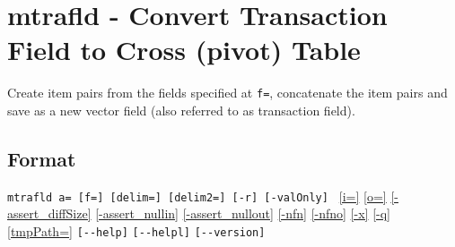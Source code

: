 
%

\section{mtrafld - Convert Transaction Field to Cross (pivot) Table\label{sect:mtrafld}}
Create item pairs from the fields specified at \verb|f=|, concatenate the item pairs and save as a new vector field (also referred to as transaction field).


\subsection*{Format}
\verb|mtrafld a= [f=] [delim=] [delim2=] [-r] [-valOnly] |   
\hyperref[sect:option_i]{[i=]}
\hyperref[sect:option_o]{[o=]}
\hyperref[sect:option_assert_diffSize]{[-assert\_diffSize]}
\hyperref[sect:option_assert_nullin]{[-assert\_nullin]}
\hyperref[sect:option_assert_nullout]{[-assert\_nullout]}
\hyperref[sect:option_nfn]{[-nfn]} 
\hyperref[sect:option_nfno]{[-nfno]}  
\hyperref[sect:option_x]{[-x]}
\hyperref[sect:option_q]{[-q]}
\hyperref[sect:option_option_tmppath]{[tmpPath=]}
\verb|[--help]|
\verb|[--helpl]|
\verb|[--version]|\\

